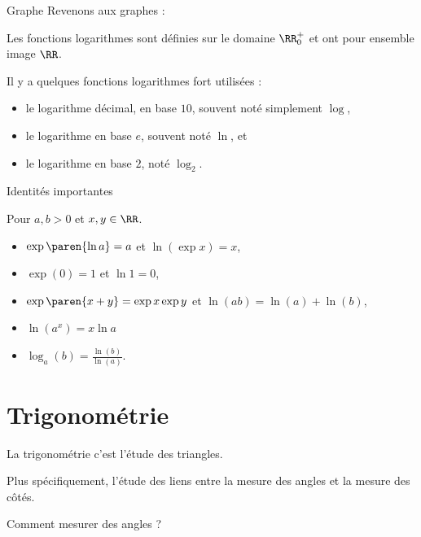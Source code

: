 \begin{frame}{Graphe}
  Revenons aux graphes :
  \begin{center}
  \end{center}
\end{frame}

\begin{frame}
  Les fonctions logarithmes sont définies sur le domaine $\RR_0^+$ et ont pour ensemble image $\RR$.
  \pause
  
  Il y a quelques fonctions logarithmes fort utilisées :
  \begin{itemize}
  \item le logarithme décimal, en base $10$, souvent noté simplement $\log$,
  \item le logarithme en base $e$, souvent noté $\ln$, et
  \item le logarithme en base $2$, noté $\log_{2}$.
  \end{itemize}
\end{frame}

\begin{frame}{Identités importantes}\label{expologimportantid}
  \begin{proposition}
    Pour $a, b > 0$ et $x, y \in \RR$.
    \begin{itemize}
    \item $\exp\paren{{\ln a}} = a$ et $\ln(\exp x) = x$,
    \item $\exp (0) = 1$ et $\ln 1 = 0$,
    \item $\exp\paren{x+y} = \exp x \exp y$ et $\ln(a b) = \ln(a) + \ln(b)$,
    \item $\ln (a^x) = x \ln a$
    \item $\log_{a}(b) = \frac{\ln(b)}{\ln(a)}$.
    \end{itemize}
  \end{proposition}
\end{frame}

\section{Trigonométrie}
\begin{frame}
La trigonométrie c'est l'étude des triangles.

Plus spécifiquement, l'étude des liens entre la mesure des angles et la mesure des côtés.

Comment mesurer des angles ?
\end{frame}

